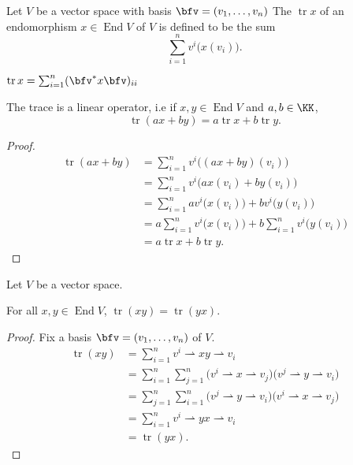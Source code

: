 \documentclass{article}
\DeclareMathOperator{\End}{End}
\DeclareMathOperator{\tr}{tr}
\begin{document}
\begin{definition}
    Let $V$ be a vector space with basis $\bfv = (v_1,\ldots,v_n)$
    The  $\tr x$ of an endomorphism $x \in \End V$ of $V$ is defined to be the sum
    \[
        \sum_{i=1}^n 
        v^i\Big(x(v_i)\Big).
    \]
\end{definition}

\begin{proposition}
    $\tr x = \sum_{i=1}^n (\bfv^\ast x \bfv)_{ii}$
\end{proposition}

\begin{theorem}
    The trace is a linear operator, i.e if $x, y \in \End V$ and $a,b \in \KK$,
    \[
        \tr(ax + by)
        =
        a\tr x + b \tr y.
    \]
\end{theorem}
\begin{proof}
    \begin{align*}
        \tr (ax + by)
        &=
        \sum_{i=1}^n 
        v^i\Big((ax + by)(v_i)\Big)
        \\
        &=
        \sum_{i=1}^n 
        v^i\Big(ax(v_i) + by(v_i)\Big)
        \\
        &=
        \sum_{i=1}^n 
        av^i\Big(x(v_i)\Big)
        + bv^i\Big(y(v_i)\Big)
        \\
        &=
        a
        \sum_{i=1}^n 
        v^i\Big(x(v_i)\Big)
        + 
        b
        \sum_{i=1}^n 
        v^i\Big(y(v_i)\Big)
        \\
        &=
        a \tr x + b \tr y.
    \end{align*}
\end{proof}

\begin{theorem}
    Let $V$ be a vector space.

    For all $x, y \in \End V$, $\tr(xy) = \tr(yx)$.
\end{theorem}

\begin{proof}
    Fix a basis $\bfv = (v_1, \ldots, v_n)$ of $V$.
    \begin{align*}
        \tr (xy)
        &=
        \sum_{i=1}^n 
        v^i \rightharpoonup xy \rightharpoonup v_i
        \\
        &=
        \sum_{i=1}^n 
        \sum_{j=1}^n
        \Big(
            v^i \rightharpoonup x \rightharpoonup v_j
        \Big) 
        \Big(
            v^j \rightharpoonup y \rightharpoonup v_i
        \Big)
        \\
        &=
        \sum_{j=1}^n
        \sum_{i=1}^n 
        \Big(
            v^j \rightharpoonup y \rightharpoonup v_i
        \Big)
        \Big(
            v^i \rightharpoonup x \rightharpoonup v_j
        \Big) 
        \\
        &=
        \sum_{i=1}^n 
        v^i \rightharpoonup yx \rightharpoonup v_i
        \\
        &=
        \tr (yx).
    \end{align*}
\end{proof}
\end{document}

